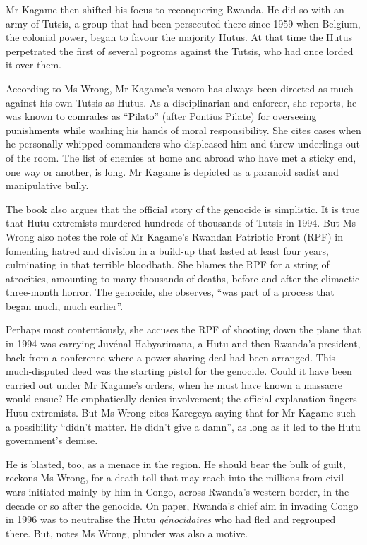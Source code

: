 \documentclass{article}
\begin{document}
Mr Kagame then shifted his focus to reconquering Rwanda. He did so with an army of Tutsis, a group that had been persecuted there since 1959 when Belgium, the colonial power, began to favour the majority Hutus. At that time the Hutus perpetrated the first of several pogroms against the Tutsis, who had once lorded it over them. 

According to Ms Wrong, Mr Kagame's venom has always been directed as much against his own Tutsis as Hutus. As a disciplinarian and enforcer, she reports, he was known to comrades as ``Pilato'' (after Pontius Pilate) for overseeing punishments while washing his hands of moral responsibility. She cites cases when he personally whipped commanders who displeased him and threw underlings out of the room. The list of enemies at home and abroad who have met a sticky end, one way or another, is long. Mr Kagame is depicted as a paranoid sadist and manipulative bully. 

The book also argues that the official story of the genocide is simplistic. It is true that Hutu extremists murdered hundreds of thousands of Tutsis in 1994. But Ms Wrong also notes the role of Mr Kagame's Rwandan Patriotic Front (RPF) in fomenting hatred and division in a build-up that lasted at least four years, culminating in that terrible bloodbath. She blames the RPF for a string of atrocities, amounting to many thousands of deaths, before and after the climactic three-month horror. The genocide, she observes, ``was part of a process that began much, much earlier''. 

Perhaps most contentiously, she accuses the RPF of shooting down the plane that in 1994 was carrying Juvénal Habyarimana, a Hutu and then Rwanda's president, back from a conference where a power-sharing deal had been arranged. This much-disputed deed was the starting pistol for the genocide. Could it have been carried out under Mr Kagame's orders, when he must have known a massacre would ensue? He emphatically denies involvement; the official explanation fingers Hutu extremists. But Ms Wrong cites Karegeya saying that for Mr Kagame such a possibility ``didn't matter. He didn't give a damn'', as long as it led to the Hutu government's demise. 

He is blasted, too, as a menace in the region. He should bear the bulk of guilt, reckons Ms Wrong, for a death toll that may reach into the millions from civil wars initiated mainly by him in Congo, across Rwanda's western border, in the decade or so after the genocide. On paper, Rwanda's chief aim in invading Congo in 1996 was to neutralise the Hutu \emph{génocidaires} who had fled and regrouped there. But, notes Ms Wrong, plunder was also a motive. 
\end{document}
